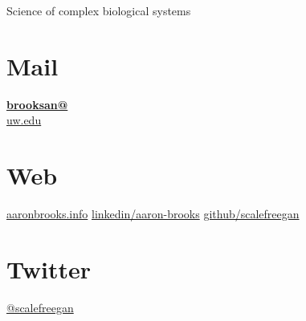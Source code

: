 \documentclass[]{friggeri-cv}
\begin{document}
      {Science of complex biological systems}
      

\begin{aside}
  \section{Mail}
    \href{mailto:brooksan@uw.edu}{\textbf{brooksan@}\\uw.edu}
    ~
  \section{Web}
    \href{http://www.aaron-brooks.org}{aaronbrooks.info}
    \href{https://www.linkedin.com/pub/aaron-brooks/17/774/3b3}{linkedin/aaron-brooks}
    \href{https://github.com/scalefreegan}{github/scalefreegan}
   ~
  \section{Twitter}
    \href{https://twitter.com/scalefreegan}{@scalefreegan}
    ~
    ~
    ~
    ~
    ~
    ~
    ~
    ~
    ~
    ~
    ~
    ~
    ~
    ~
    ~
    ~
    ~
\end{aside}
\end{document}
